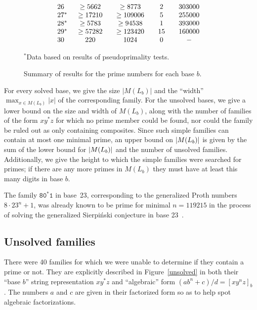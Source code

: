 \documentclass[12pt]{article}
\DeclarePairedDelimiter\abs{\lvert}{\rvert}
\theoremstyle{plain}
\theoremstyle{definition}
\newcommand{\0}{\mathtt{0}}
\newcommand{\1}{\mathtt{1}}
\newcommand{\2}{\mathtt{2}}
\newcommand{\3}{\mathtt{3}}
\newcommand{\4}{\mathtt{4}}
\newcommand{\5}{\mathtt{5}}
\newcommand{\6}{\mathtt{6}}
\newcommand{\7}{\mathtt{7}}
\newcommand{\8}{\mathtt{8}}
\newcommand{\9}{\mathtt{9}}
\begin{document}
\begin{figure}
\[\begin{array}{c@{\qquad}c@{\qquad}c@{\qquad}c@{\qquad}c}
26 & \geq5662 & \geq8773 & 2 & 303000 \\ 
27\mathrlap{^*} & \geq17210 & \geq109006 & 5 & 255000 \\ 
28\mathrlap{^*} & \geq5783 & \geq94538 & 1 & 393000 \\
29\mathrlap{^*} & \geq57282 & \geq123420 & 15 & 160000 \\
30 & 220 & 1024 & 0 & -
\end{array}\]
\begin{center}$^*$Data based on results of pseudoprimality tests.\end{center}
\caption{Summary of results for the prime numbers for each base $b$.}
\label{resultsfig}
\end{figure}

For every solved base, we give the size $|M(L_b)|$ and the ``width'' $\max_{x \in M(L_b)} |x|$ of
the corresponding family.
For the unsolved bases, we give a lower bound on the size and width of $M(L_b)$,
along with the number of families of the form
$xy^*z$ for which no prime member could be found, nor could the family be
ruled out as only containing composites.  Since such simple families can contain at
most one minimal prime, an upper bound on $\abs{M(L_b)}$ is given by the
sum of the lower bound for $\abs{M(L_b)}$ and the number of unsolved families.
Additionally, we give the height to which the simple families were searched
for primes; if there are any more primes in $M(L_b)$ they must have at least
this many digits in base $b$.

The family $\8\0^*\1$ in base~23, corresponding to the
generalized Proth numbers $8\cdot23^n+1$, was already known to be prime
for minimal $n=119215$ in the process
of solving the generalized Sierpi\'nski conjecture in base 23~\cite{crus}.

\subsection{Unsolved families}
There were 40 families for which we were unable to determine if they contain a prime or not.
They are explicitly described in Figure~\ref{unsolved} in both their ``base $b$'' string representation
$xy^*z$ and ``algebraic'' form $(ab^n+c)/d=[xy^nz]_b$.  The numbers $a$ and $c$ are given in their factorized form
so as to help spot algebraic factorizations.
\end{document}
